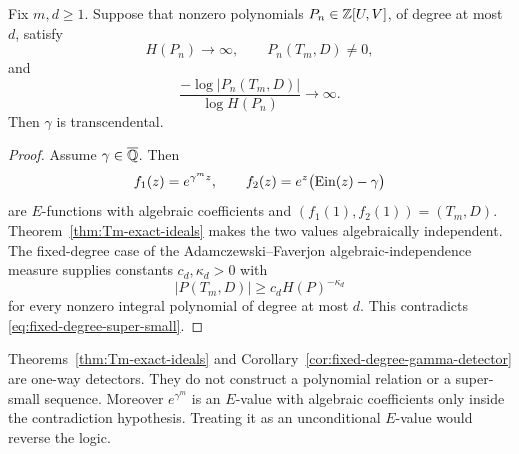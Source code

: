 \begin{corollary}
\label{cor:fixed-degree-gamma-detector}
Fix \(m,d\ge1\).  Suppose that nonzero polynomials
\(P_n\in\mathbb Z[U,V]\), of degree at most \(d\), satisfy
\[
 H(P_n)\longrightarrow\infty,\qquad
 P_n(T_m,D)\ne0,
\]
and
\begin{equation}\label{eq:fixed-degree-super-small}
 \frac{-\log|P_n(T_m,D)|}{\log H(P_n)}\longrightarrow\infty.
\end{equation}
Then \(\gamma\) is transcendental.
\end{corollary}

\begin{proof}
Assume \(\gamma\in\overline{\mathbb Q}\).  Then
\[
 f_1(z)=e^{\gamma^m z},\qquad
 f_2(z)=e^z\bigl(\operatorname{Ein}(z)-\gamma\bigr)
\]
are \(E\)-functions with algebraic coefficients and
\((f_1(1),f_2(1))=(T_m,D)\).  Theorem~\ref{thm:Tm-exact-ideals} makes the
two values algebraically independent.  The fixed-degree case of the
Adamczewski--Faverjon algebraic-independence measure
\cite{AdamczewskiFaverjon2025} supplies constants \(c_d,\kappa_d>0\) with
\[
 |P(T_m,D)|\ge c_dH(P)^{-\kappa_d}
\]
for every nonzero integral polynomial of degree at most \(d\).  This
contradicts \eqref{eq:fixed-degree-super-small}.
\end{proof}

\begin{remark}
Theorems~\ref{thm:Tm-exact-ideals} and
Corollary~\ref{cor:fixed-degree-gamma-detector} are one-way detectors.
They do not construct a polynomial relation or a super-small sequence.
Moreover \(e^{\gamma^m}\) is an \(E\)-value with algebraic coefficients
only inside the contradiction hypothesis.  Treating it as an unconditional
\(E\)-value would reverse the logic.
\end{remark}
